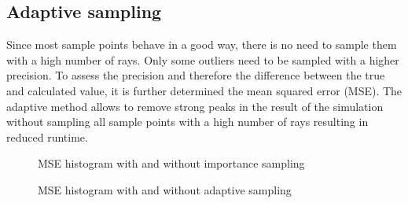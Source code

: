 \subsection{Adaptive sampling}
\label{subsec:adaptive_sampling}
Since most sample points behave in a good way, there is no need
to sample them with a high number of rays. Only some outliers need to
be sampled with a higher precision. To assess the precision
and therefore the difference between the true and calculated value,
it is further determined the mean squared error (MSE).
The adaptive method allows to remove strong peaks in the result
of the simulation without sampling all sample points with
a high number of rays resulting in reduced runtime.
\begin{figure}[H]
  \centerline{
    }
  \caption{MSE histogram with and without importance sampling}
  \label{plot:adaptive}
\end{figure}
\begin{figure}[H]
  \centerline{
    }
  \caption{MSE histogram with and without adaptive sampling}
  \label{plot:adaptive2}
\end{figure}

